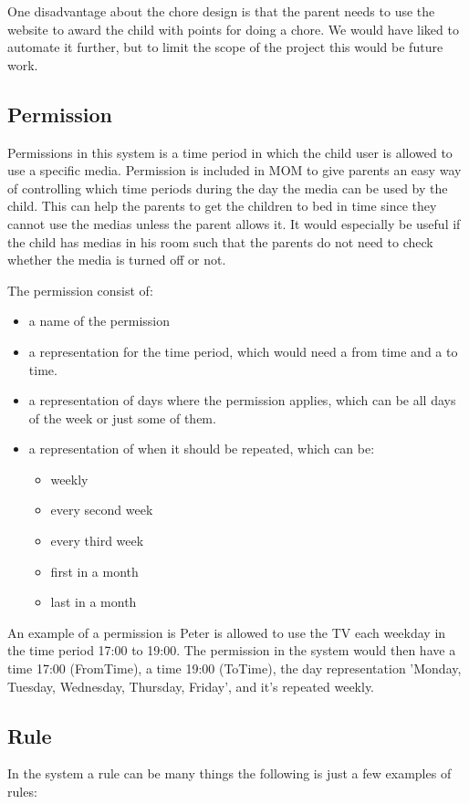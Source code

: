 One disadvantage about the chore design is that the parent needs to use the website to award the child with points for doing a chore. We would have liked to automate it further, but to limit the scope of the project this would be future work.  

\subsection{Permission}
Permissions in this system is a time period in which the child user is allowed to use a specific media. Permission is included in MOM to give parents an easy way of controlling which time periods during the day the media can be used by the child. This can help the parents to get the children to bed in time since they cannot use the medias unless the parent allows it. It would especially be useful if the child has medias in his room such that the parents do not need to check whether the media is turned off or not. 

The permission consist of:
\begin{itemize}
	\item a name of the permission
	\item a representation for the time period, which would need a from time and a to time. 
	\item a representation of days where the permission applies, which can be all days of the week or just some of them.
	\item a representation of when it should be repeated, which can be:
		\begin{itemize}
		\item weekly
		\item every second week
		\item every third week
		\item first in a month
		\item last in a month
		\end{itemize}
\end{itemize}

An example of a permission is Peter is allowed to use the TV each weekday in the time period 17:00 to 19:00. The permission in the system would then have a time 17:00 (FromTime), a time 19:00 (ToTime), the day representation 'Monday, Tuesday, Wednesday, Thursday, Friday', and it's repeated weekly.


\subsection{Rule}
In the system a rule can be many things the following is just a few examples of rules:

